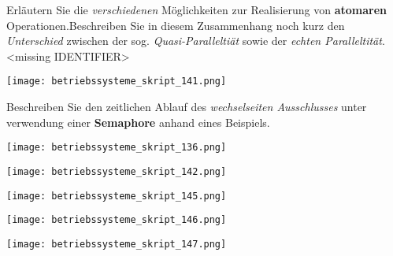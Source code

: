 \documentclass{article}
\begin{document}
\begin{tcolorbox}[colback=white!10!white,colframe=lightgray!75!black,
  savelowerto=\jobname_ex.tex,breakable,enhanced,lines before break=40]

\justifying
Erläutern Sie die \textit{verschiedenen} Möglichkeiten zur Realisierung von \textbf{atomaren} Operationen.Beschreiben Sie in diesem Zusammenhang noch kurz den \textit{Unterschied} zwischen der sog. \textit{Quasi-Paralleltiät} sowie der \textit{echten Paralleltität}.<missing IDENTIFIER>

\tcblower

\justifying
\begin{center}
\texttt{[image: betriebssysteme\_skript\_141.png]}
\end{center}

\end{tcolorbox}
\begin{tcolorbox}[colback=white!10!white,colframe=lightgray!75!black,
  savelowerto=\jobname_ex.tex,breakable,enhanced,lines before break=40]

\justifying
Beschreiben Sie den zeitlichen Ablauf des \textit{wechselseiten Ausschlusses} unter verwendung einer \textbf{Semaphore} anhand eines Beispiels.

\tcblower

\justifying
\begin{center}
\texttt{[image: betriebssysteme\_skript\_136.png]}
\end{center}
\begin{center}
\texttt{[image: betriebssysteme\_skript\_142.png]}
\end{center}
\begin{center}
\texttt{[image: betriebssysteme\_skript\_145.png]}
\end{center}
\begin{center}
\texttt{[image: betriebssysteme\_skript\_146.png]}
\end{center}
\begin{center}
\texttt{[image: betriebssysteme\_skript\_147.png]}
\end{center}

\end{tcolorbox}
\end{document}
